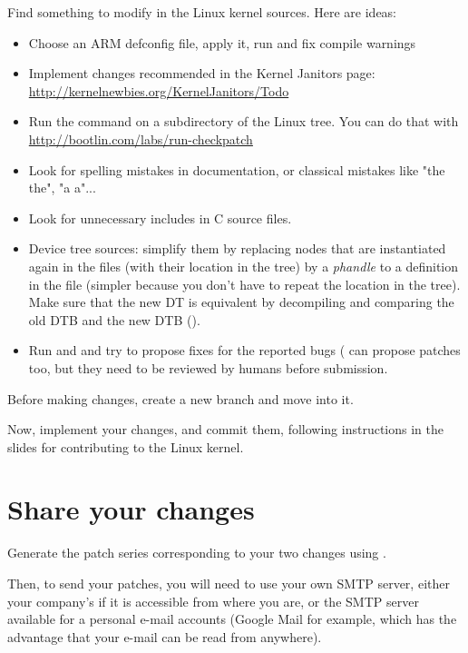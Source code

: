 Find something to modify in the Linux kernel sources. Here are ideas:

\begin{itemize}
\item Choose an ARM defconfig file, apply it, run  and fix compile warnings
\item Implement changes recommended in the Kernel Janitors page: \url{http://kernelnewbies.org/KernelJanitors/Todo}
\item Run the  command on a subdirectory of the Linux tree.
      You can do that with \url{http://bootlin.com/labs/run-checkpatch}
\item Look for spelling mistakes in documentation, or classical mistakes like "the the", "a a"...
\item Look for unnecessary includes in C source files.
\item Device tree sources: simplify them by replacing nodes that are
      instantiated again in the  files (with their location
      in the tree) by a {\em phandle} to a definition in the  file
      (simpler because you don't have to repeat the location in the tree).
      Make sure that the new DT is equivalent by decompiling and comparing the old DTB
      and the new DTB ().
\item Run  and 
      and try to propose fixes for the reported bugs (
      can propose patches too, but they need to be reviewed by humans
      before submission.

\end{itemize}

Before making changes, create a new branch and move into it.

Now, implement your changes, and commit them, following instructions
in the slides for contributing to the Linux kernel.

\section{Share your changes}

Generate the patch series corresponding to your two changes using
.

Then, to send your patches, you will need to use your own SMTP server, either your company's
if it is accessible from where you are, or the SMTP server available for a personal e-mail
accounts (Google Mail for example, which has the advantage that your e-mail can be read
from anywhere).

